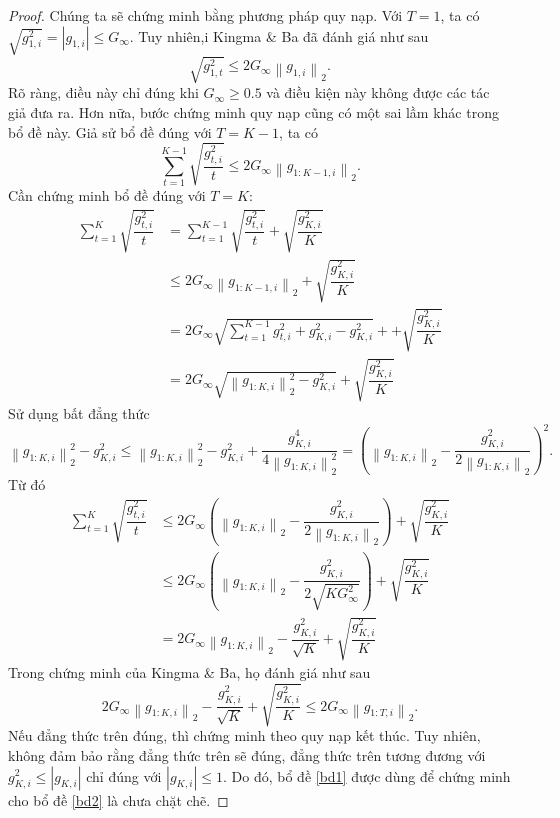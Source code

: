 \documentclass[11pt,oneside,a4paper]{report}
\theoremstyle{definition}
\begin{document}
\begin{proof}
	Chúng ta sẽ chứng minh bằng phương pháp quy nạp.
	Với $T=1$, ta có $\sqrt{g_{1, i}^2}=\left|g_{1, i}\right| \leq G_{\infty}$.
	Tuy nhiên,i Kingma \& Ba đã đánh giá như sau
	$$
	\sqrt{g_{1, t}^2} \leq 2 G_{\infty}\left\|g_{1, i}\right\|_2.
	$$
	Rõ ràng, điều này chỉ đúng khi $G_{\infty} \geq 0.5$ và điều kiện này không được các tác giả đưa ra. Hơn nữa, bước chứng minh quy nạp cũng có một sai lầm khác trong bổ đề này.
	Giả sử bổ đề đúng với $T=K-1$, ta có
	$$
	\sum_{t=1}^{K-1} \sqrt{\dfrac{g_{t, i}^2}{t}} \leq 2 G_{\infty}\left\|g_{1: K-1, i}\right\|_2.
	$$
	Cần chứng minh bổ đề đúng với $T=K$:
	$$
	\begin{aligned}
	\sum_{t=1}^K \sqrt{\dfrac{g_{t, i}^2}{t}} &=\sum_{t=1}^{K-1} \sqrt{\dfrac{g_{t, i}^2}{t}}+\sqrt{\dfrac{g_{K, i}^2}{K}} \\
	& \leq 2 G_{\infty}\left\|g_{1: K-1, i}\right\|_2+\sqrt{\dfrac{g_{K, i}^2}{K}} \\
	&=2 G_{\infty} \sqrt{\sum_{t=1}^{K-1} g_{t, i}^2+g_{K, i}^2-g_{K, i}^2}++\sqrt{\dfrac{g_{K, i}^2}{K}} \\
	&=2 G_{\infty} \sqrt{\left\|g_{1: K, i}\right\|_2^2-g_{K, i}^2}+\sqrt{\dfrac{g_{K, i}^2}{K}}
	\end{aligned}
	$$
	Sử dụng bất đẳng thức
	$$
	\left\|g_{1: K, i}\right\|_2^2-g_{K, i}^2 \leq\left\|g_{1: K, i}\right\|_2^2-g_{K, i}^2+\dfrac{g_{K, i}^4}{4\left\|g_{1: K, i}\right\|_2^2}=\left(\left\|g_{1: K, i}\right\|_2-\dfrac{g_{K, i}^2}{2\left\|g_{1: K, i}\right\|_2}\right)^2.
	$$
	Từ đó
	$$
	\begin{aligned}
	\sum_{t=1}^K \sqrt{\dfrac{g_{t, i}^2}{t}} & \leq 2 G_{\infty}\left(\left\|g_{1: K, i}\right\|_2-\dfrac{g_{K, i}^2}{2\left\|g_{1: K, i}\right\|_2}\right)+\sqrt{\dfrac{g_{K, i}^2}{K}} \\
	& \leq 2 G_{\infty}\left(\left\|g_{1: K, i}\right\|_2-\dfrac{g_{K, i}^2}{2 \sqrt{K G_{\infty}^2}}\right)+\sqrt{\dfrac{g_{K, i}^2}{K}} \\
	&=2 G_{\infty}\left\|g_{1: K, i}\right\|_2-\dfrac{g_{K, i}^2}{\sqrt{K}}+\sqrt{\dfrac{g_{K, i}^2}{K}}
	\end{aligned}
	$$
	Trong chứng minh của Kingma \& Ba, họ đánh giá như sau
	$$
	2 G_{\infty}\left\|g_{1: K, i}\right\|_2-\dfrac{g_{K, i}^2}{\sqrt{K}}+\sqrt{\dfrac{g_{K, i}^2}{K}} \leq 2 G_{\infty}\left\|g_{1: T, i}\right\|_2.
	$$
	Nếu đẳng thức trên đúng, thì chứng minh theo quy nạp kết thúc. Tuy nhiên, không đảm bảo rằng đẳng thức trên sẽ đúng, đẳng thức trên tương đương với $g_{K, i}^2 \leq\left|g_{K, i}\right|$ chỉ đúng với $\left|g_{K, i}\right| \leq 1$. Do đó, bổ đề \ref{bd1} được dùng để chứng minh cho bổ đề \ref{bd2} là chưa chặt chẽ.
\end{proof}
\end{document}
